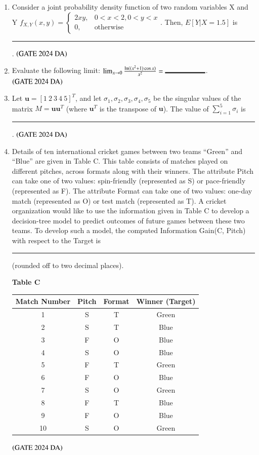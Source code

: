 \documentclass[journal,12pt,onecolumn]{IEEEtran}
\theoremstyle{remark}
\begin{document}
\begin{enumerate}[resume]
\item Consider a joint probability density function of two random variables X and Y $f_{X,Y}(x, y) = \begin{cases} 2xy, & 0 < x < 2, 0 < y < x \\ 0, & \text{otherwise} \end{cases}$. Then, $E[Y|X = 1.5]$ is  \rule{2cm}{0.5mm}.
\hfill $\left(\text{GATE 2024 DA}\right)$
\bigskip

\item Evaluate the following limit: $\lim_{x\to0} \frac{\ln((x^2+1) \cos x)}{x^2} =  \rule{2cm}{0.5mm}$.
\hfill $\left(\text{GATE 2024 DA}\right)$
\bigskip

\item Let $\boldsymbol{u} = [1 \ 2 \ 3 \ 4 \ 5]^T$, and let $\sigma_1, \sigma_2, \sigma_3, \sigma_4, \sigma_5$ be the singular values of the matrix $M = \boldsymbol{u}\boldsymbol{u}^T$ (where $\boldsymbol{u}^T$ is the transpose of $\boldsymbol{u}$). The value of $\sum_{i=1}^5 \sigma_i$ is  \rule{2cm}{0.5mm}.
\hfill $\left(\text{GATE 2024 DA}\right)$
\bigskip

\item Details of ten international cricket games between two teams ``Green'' and ``Blue'' are given in Table C. This table consists of matches played on different pitches, across formats along with their winners. The attribute Pitch can take one of two values: spin-friendly (represented as S) or pace-friendly (represented as F). The attribute Format can take one of two values: one-day match (represented as O) or test match (represented as T). A cricket organization would like to use the information given in Table C to develop a decision-tree model to predict outcomes of future games between these two teams. To develop such a model, the computed Information Gain(C, Pitch) with respect to the Target is  \rule{2cm}{0.5mm} (rounded off to two decimal places).
\begin{center}
\textbf{Table C} \\
\begin{tabular}{|c|c|c|c|}
\hline
\textbf{Match Number} & \textbf{Pitch} & \textbf{Format} & \textbf{Winner (Target)} \\
\hline
1 & S & T & Green \\
2 & S & T & Blue \\
3 & F & O & Blue \\
4 & S & O & Blue \\
5 & F & T & Green \\
6 & F & O & Blue \\
7 & S & O & Green \\
8 & F & T & Blue \\
9 & F & O & Blue \\
10 & S & O & Green \\
\hline
\end{tabular}
\end{center}
\hfill $\left(\text{GATE 2024 DA}\right)$
\bigskip


\end{enumerate}
\end{document}
